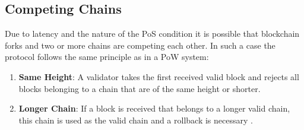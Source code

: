 \subsection{Competing Chains}
Due to latency and the nature of the PoS condition it is possible that blockchain forks and two or more chains are competing each other. In such a case the protocol follows the same principle as in a PoW system:

\begin{enumerate}
	\item \textbf{Same Height}: A validator takes the first received valid block and rejects all blocks belonging to a chain that are of the same height or shorter.
	\item \textbf{Longer Chain}: If a block is received that belongs to a longer valid chain, this chain is used as the valid chain and a rollback is necessary \cite{bazo_paper}.
\end{enumerate} 